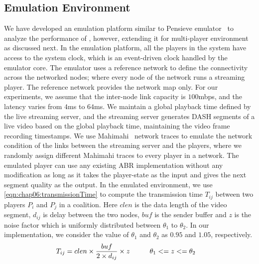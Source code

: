 \subsection{Emulation Environment}
\label{sec:chap06:simulatorprop}
We have developed an emulation platform similar to Pensieve emulator~\cite{mao2017neural} to analyze the performance of \our, however, extending it for multi-player environment as discussed next. In the emulation platform, all the players in the system have access to the system clock, which is an event-driven clock handled by the emulator core. The emulator uses a reference network to define the connectivity across the networked nodes; where every node of the network runs a streaming player. The reference network provides the network map only. For our experiments, we assume that the inter-node link capacity is $100$mbps, and the latency varies from $4$ms to $64$ms. We maintain a global playback time defined by the live streaming server, and the streaming server generates \ac{DASH} segments of a live video based on the global playback time, maintaining the video frame recording timestamps. We use Mahimahi~\cite{mahimahi} network traces to emulate the network condition of the links between the streaming server and the players, where we randomly assign different Mahimahi traces to every player in a network. The emulated player can use any existing \ac{ABR} implementation without any modification as long as it takes the player-state as the input and gives the next segment quality as the output.
In the emulated environment, we use \eqn\ref{eqn:chap06:transmissionTime} to compute the transmission time $T_{ij}$ between two players $P_i$ and $P_j$ in a coalition. Here $clen$ is the data length of the video segment, $d_{ij}$ is delay between the two nodes, $buf$ is the sender buffer and $z$ is the noise factor which is uniformly distributed between $\theta_1$ to $\theta_2$. In our implementation, we consider the value of $\theta_1$ and $\theta_2$ as $0.95$ and $1.05$, respectively.
\begin{align}
T_{ij} = clen\times \frac{buf}{2\times d_{ij}} \times z \mbox{\hspace{1cm}}& \theta_1 <= z <= \theta_2
\label{eqn:chap06:transmissionTime}
\end{align}

